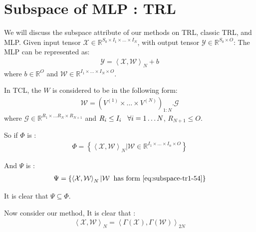 \documentclass{article}
\begin{document}
\section{Subspace of MLP : TRL}
\label{subspace-trl}
We will discuss the subspace attribute of our methods on TRL, classic TRL, and MLP. 
Given input tensor $\mathcal{X} \in \mathbb{R}^{S_0\times I_1\times \dots\times I_N}$, with output tensor $\mathcal{Y} \in \mathbb{R}^{S_0\times O}$: 
%
The MLP can be represented as:
\begin{align}
	\label{eq:subspace-tr1-53}
	\mathcal{Y} = \left\langle \mathcal{X}, \mathcal{W}\right\rangle_N + b
\end{align}
where $b\in \mathbb{R}^O$ and $\mathcal{W}\in \mathbb{R}^{I_1\times\dots\times I_N\times O}$.

In TCL, the $W$ is considered to be in the following form:
\begin{align}
	\label{eq:subspace-tr1-54}
	\mathcal{W} = \left(V^{(1)}\times\dots\times V^{(N)}\right)_{1:N}.\mathcal{G}
\end{align}
where $\mathcal{G}\in \mathbb{R}^{R_1\times \dots R_N\times R_{N+1}}$ and $R_i \leq I_i \hspace{3mm}\forall i = 1\dots N$, $R_{N+1} \leq O$.

So if $\Phi$  is :
\begin{align}
		\label{eq:subspace-tr1-55}
		\Phi = \left\{
		\left\langle \mathcal{X}, \mathcal{W}\right\rangle_N | \mathcal{W} \in \mathbb{R}^{I_1\times \dots\times I_n\times O}
		\right\}
\end{align}

And $\Psi$ is :
\begin{align}
	\label{eq:subspace-tr1-56}
	\Psi = \left\{
	\left\langle \mathcal{X}, \mathcal{W}\right\rangle_N | \mathcal{W} \hspace{2mm}\text{has form \ref{eq:subspace-tr1-54}}
	\right\}
\end{align}

It is clear that $\Psi \subseteq \Phi$.


Now consider our method, It is clear that :
\begin{align}
	\label{eq:subspace-tr1-57}
	\left\langle \mathcal{X}, \mathcal{W}\right\rangle_N  = \left\langle \Gamma(\mathcal{X}), \Gamma(\mathcal{W})\right\rangle_{2N} 
\end{align}
\end{document}
